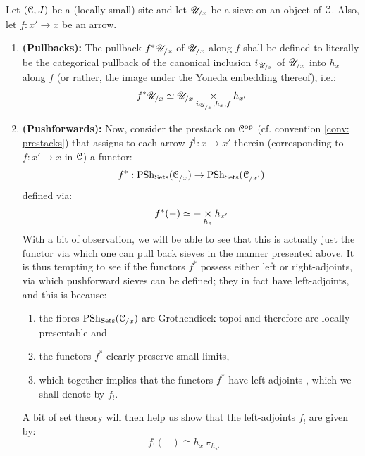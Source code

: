                     \begin{convention} \label{conv: pullback_and_pushforward_sieves}
                        Let $(\mathcal{C}, J)$ be a (locally small) site and let $\mathscr{U}_{/x}$ be a sieve on an object of $\mathcal{C}$. Also, let $f: x' \to x$ be an arrow.
                            \begin{enumerate}
                                \item \textbf{(Pullbacks):} The pullback $f^*\mathscr{U}_{/x}$ of $\mathscr{U}_{/x}$ along $f$ shall be defined to literally be the categorical pullback of the canonical inclusion $i_{\mathscr{U}_{/x}}$ of $\mathscr{U}_{/x}$ into $h_x$ along $f$ (or rather, the image under the Yoneda embedding thereof), i.e.:
                                    $$f^*\U_{/x} \cong \U_{/x} \x_{i_{\U_{/x}}, h_x, f} h_{x'}$$
                                \item \textbf{(Pushforwards):} Now, consider the prestack on $\mathcal{C}^{\mathrm{op}}$ (cf. convention \ref{conv: prestacks}) that assigns to each arrow $f^{\dagger}: x \to x'$ therein (corresponding to $f: x' \to x$ in $\mathcal{C}$) a functor:
                                    $$f^*: \mathrm{PSh}_{\mathrm{Sets}}(\mathcal{C}_{/x}) \to \mathrm{PSh}_{\mathrm{Sets}}(\mathcal{C}_{/x'})$$
                                defined via:
                                    $$f^*(-) \cong - \x_{h_x} h_{x'}$$
                                With a bit of observation, we will be able to see that this is actually just the functor via which one can pull back sieves in the manner presented above. It is thus tempting to see if the functors $f^*$ possess either left or right-adjoints, via which pushforward sieves can be defined; they in fact have left-adjoints, and this is because:
                                    \begin{enumerate}
                                        \item the fibres $\mathrm{PSh}_{\mathrm{Sets}}(\mathcal{C}_{/x})$ are Grothendieck topoi and therefore are locally presentable and
                                        \item the functors $f^*$ clearly preserve small limits,
                                        \item which together implies that the functors $f^*$ have left-adjoints \cite[Theorem 2.2]{nlab:adjoint_functor_theorem}, which we shall denote by $f_!$.
                                    \end{enumerate}
                                A bit of set theory will then help us show that the left-adjoints $f_!$ are given by:
                                    $$f_!(-) \cong h_x \pushout_{h_{x'}} -$$
                            \end{enumerate}
                    \end{convention}
                
